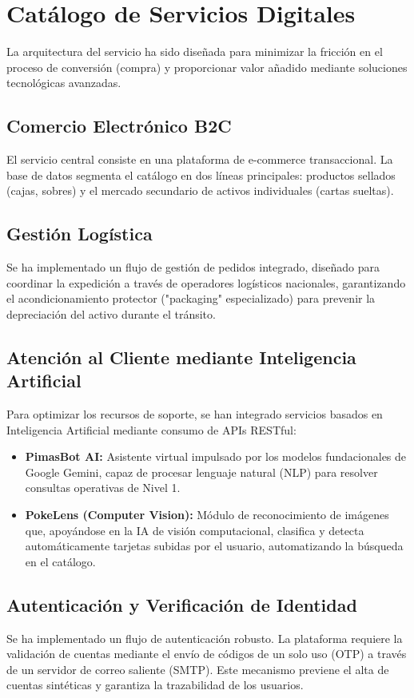 \documentclass[12pt,a4paper]{article}
\begin{document}
\newpage
\section{Catálogo de Servicios Digitales}
\label{Servicios}

La arquitectura del servicio ha sido diseñada para minimizar la fricción en el proceso de conversión (compra) y proporcionar valor añadido mediante soluciones tecnológicas avanzadas.

\subsection{Comercio Electrónico B2C}
El servicio central consiste en una plataforma de e-commerce transaccional. La base de datos segmenta el catálogo en dos líneas principales: productos sellados (cajas, sobres) y el mercado secundario de activos individuales (cartas sueltas).

\subsection{Gestión Logística}
Se ha implementado un flujo de gestión de pedidos integrado, diseñado para coordinar la expedición a través de operadores logísticos nacionales, garantizando el acondicionamiento protector ("packaging" especializado) para prevenir la depreciación del activo durante el tránsito.

\subsection{Atención al Cliente mediante Inteligencia Artificial}
Para optimizar los recursos de soporte, se han integrado servicios basados en Inteligencia Artificial mediante consumo de APIs RESTful:
\begin{itemize}
    \item \textbf{PimasBot AI:} Asistente virtual impulsado por los modelos fundacionales de Google Gemini, capaz de procesar lenguaje natural (NLP) para resolver consultas operativas de Nivel 1.
    \item \textbf{PokeLens (Computer Vision):} Módulo de reconocimiento de imágenes que, apoyándose en la IA de visión computacional, clasifica y detecta automáticamente tarjetas subidas por el usuario, automatizando la búsqueda en el catálogo.
\end{itemize}

\subsection{Autenticación y Verificación de Identidad}
Se ha implementado un flujo de autenticación robusto. La plataforma requiere la validación de cuentas mediante el envío de códigos de un solo uso (OTP) a través de un servidor de correo saliente (SMTP). Este mecanismo previene el alta de cuentas sintéticas y garantiza la trazabilidad de los usuarios.
\end{document}
